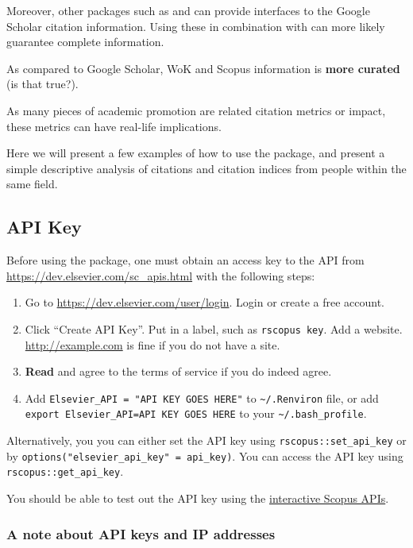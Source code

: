 Moreover, other packages such as  and  can
provide interfaces to the Google Scholar citation information. Using
these in combination with  can more likely guarantee
complete information.

As compared to Google Scholar, WoK and Scopus information is
\textbf{more curated} (is that true?).

As many pieces of academic promotion are related citation metrics or
impact, these metrics can have real-life implications.

Here we will present a few examples of how to use the 
package, and present a simple descriptive analysis of citations and
citation indices from people within the same field.

\hypertarget{api-key}{%
\subsection{API Key}\label{api-key}}

Before using the package, one must obtain an access key to the API from
\url{https://dev.elsevier.com/sc_apis.html} with the following steps:

\begin{enumerate}
\def\labelenumi{\arabic{enumi}.}
\tightlist
\item
  Go to \url{https://dev.elsevier.com/user/login}. Login or create a
  free account.
\item
  Click ``Create API Key''. Put in a label, such as
  \texttt{rscopus\ key}. Add a website. \url{http://example.com} is fine
  if you do not have a site.
\item
  \textbf{Read} and agree to the terms of service if you do indeed
  agree.
\item
  Add \texttt{Elsevier\_API\ =\ "API\ KEY\ GOES\ HERE"} to
  \texttt{\textasciitilde{}/.Renviron} file, or add
  \texttt{export\ Elsevier\_API=API\ KEY\ GOES\ HERE} to your
  \texttt{\textasciitilde{}/.bash\_profile}.
\end{enumerate}

Alternatively, you you can either set the API key using
\texttt{rscopus::set\_api\_key} or by
\texttt{options("elsevier\_api\_key"\ =\ api\_key)}. You can access the
API key using \texttt{rscopus::get\_api\_key}.

You should be able to test out the API key using the
\href{https://dev.elsevier.com/scopus.html}{interactive Scopus APIs}.

\hypertarget{a-note-about-api-keys-and-ip-addresses}{%
\subsubsection{A note about API keys and IP
addresses}\label{a-note-about-api-keys-and-ip-addresses}}

